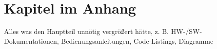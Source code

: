 \chapter{Kapitel im Anhang}
\label{sec:a-kapitel}

Alles was den Hauptteil unnötig vergrößert hätte, z. B. HW-/SW-Dokumentationen, Bedienungsanleitungen, Code-Listings, Diagramme
